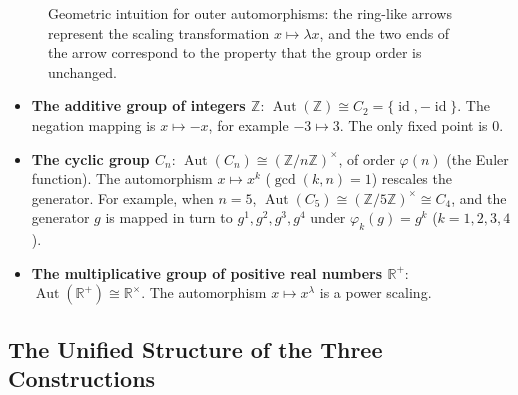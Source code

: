 \begin{figure}[htbp]
\centering
{}
\caption{Geometric intuition for outer automorphisms: the ring-like arrows represent the scaling transformation $x \mapsto \lambda x$, and the two ends of the arrow correspond to the property that the group order is unchanged.}
\label{fig:outer_automorphism_scaling}
\end{figure}

\begin{example}\label{ex:scaling_operation_examples}
\begin{itemize}
    \item \textbf{The additive group of integers $\mathbb{Z}$}: $\operatorname{Aut}(\mathbb{Z}) \cong C_2 = \{\operatorname{id}, -\operatorname{id}\}$. The negation mapping is $x \mapsto -x$, for example $-3 \mapsto 3$. The only fixed point is $0$.
    \item \textbf{The cyclic group $C_n$}: $\operatorname{Aut}(C_n) \cong (\mathbb{Z}/n\mathbb{Z})^\times$, of order $\varphi(n)$ (the Euler function). The automorphism $x \mapsto x^k$ ($\gcd(k,n)=1$) rescales the generator. For example, when $n=5$, $\operatorname{Aut}(C_5)\cong(\mathbb{Z}/5\mathbb{Z})^\times\cong C_4$, and the generator $g$ is mapped in turn to $g^1,g^2,g^3,g^4$ under $\varphi_k(g)=g^k$ ($k=1,2,3,4$).
    \item \textbf{The multiplicative group of positive real numbers $\mathbb{R}^+$}: $\operatorname{Aut}(\mathbb{R}^+) \cong \mathbb{R}^\times$. The automorphism $x \mapsto x^\lambda$ is a power scaling.
\end{itemize}
\end{example}

\subsection{The Unified Structure of the Three Constructions}

